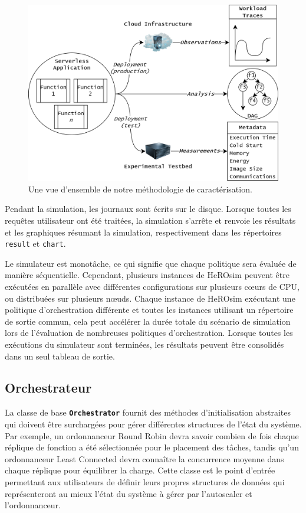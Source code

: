 \begin{figure}[t]
    \centering
    \includegraphics[width=\columnwidth]{6_Chapitre6/figures/characterization.png}
    \caption{Une vue d'ensemble de notre méthodologie de caractérisation.}
\label{figure:herosim-characterization}
\end{figure}

Pendant la simulation, les journaux sont écrits sur le disque. Lorsque toutes les requêtes utilisateur ont été traitées, la simulation s'arrête et renvoie les résultats et les graphiques résumant la simulation, respectivement dans les répertoires \texttt{result} et \texttt{chart}.

Le simulateur est monotâche, ce qui signifie que chaque politique sera évaluée de manière séquentielle. Cependant, plusieurs instances de HeROsim peuvent être exécutées en parallèle avec différentes configurations sur plusieurs cœurs de CPU, ou distribuées sur plusieurs nœuds. Chaque instance de HeROsim exécutant une politique d'orchestration différente et toutes les instances utilisant un répertoire de sortie commun, cela peut accélérer la durée totale du scénario de simulation lors de l'évaluation de nombreuses politiques d'orchestration. Lorsque toutes les exécutions du simulateur sont terminées, les résultats peuvent être consolidés dans un seul tableau de sortie.

\subsection{Orchestrateur}

La classe de base \textbf{\texttt{Orchestrator}} fournit des méthodes d'initialisation abstraites qui doivent être surchargées pour gérer différentes structures de l'état du système. Par exemple, un ordonnanceur Round Robin devra savoir combien de fois chaque réplique de fonction a été sélectionnée pour le placement des tâches, tandis qu'un ordonnanceur Least Connected devra connaître la concurrence moyenne dans chaque réplique pour équilibrer la charge. Cette classe est le point d'entrée permettant aux utilisateurs de définir leurs propres structures de données qui représenteront au mieux l'état du système à gérer par l'autoscaler et l'ordonnanceur.

